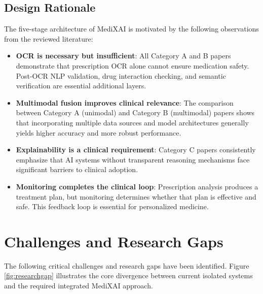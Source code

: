 \documentclass[conference]{IEEEtran}
\begin{document}
\subsection{Design Rationale}

The five-stage architecture of MediXAI is motivated by the following observations from the reviewed literature:

\begin{itemize}
    \item \textbf{OCR is necessary but insufficient}: All Category A and B papers demonstrate that prescription OCR alone cannot ensure medication safety. Post-OCR NLP validation, drug interaction checking, and semantic verification are essential additional layers.

    \item \textbf{Multimodal fusion improves clinical relevance}: The comparison between Category A (unimodal) and Category B (multimodal) papers shows that incorporating multiple data sources and model architectures generally yields higher accuracy and more robust performance.

    \item \textbf{Explainability is a clinical requirement}: Category C papers consistently emphasize that AI systems without transparent reasoning mechanisms face significant barriers to clinical adoption.

    \item \textbf{Monitoring completes the clinical loop}: Prescription analysis produces a treatment plan, but monitoring determines whether that plan is effective and safe. This feedback loop is essential for personalized medicine.
\end{itemize}












\section{Challenges and Research Gaps}
\label{sec:challenges}

The following critical challenges and research gaps have been identified. Figure \ref{fig:researchgap} illustrates the core divergence between current isolated systems and the required integrated MediXAI approach.

\vspace{1em}
\end{document}
